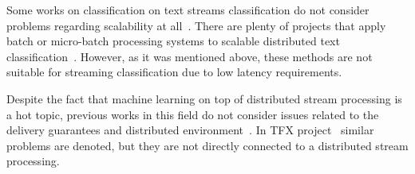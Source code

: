 \label{fs-related}

Some works on classification on text streams classification do not consider problems regarding scalability at all~\cite{zhang2008one}. There are plenty of projects that apply batch or micro-batch processing systems to scalable distributed text classification~\cite{semberecki2016distributed, 8029336, Nodarakis2016LargeSS, baltas2016apache, svyatkovskiy2016large, berral2015aloja}. However, as it was mentioned above, these methods are not suitable for streaming classification due to low latency requirements. 

Despite the fact that machine learning on top of distributed stream processing is a hot topic, previous works in this field do not consider issues related to the delivery guarantees and distributed environment~\cite{khumoyun2016real, morales2015samoa}. In TFX project~\cite{Baylor:2017:TTP:3097983.3098021} similar problems are denoted, but they are not directly connected to a distributed stream processing. 